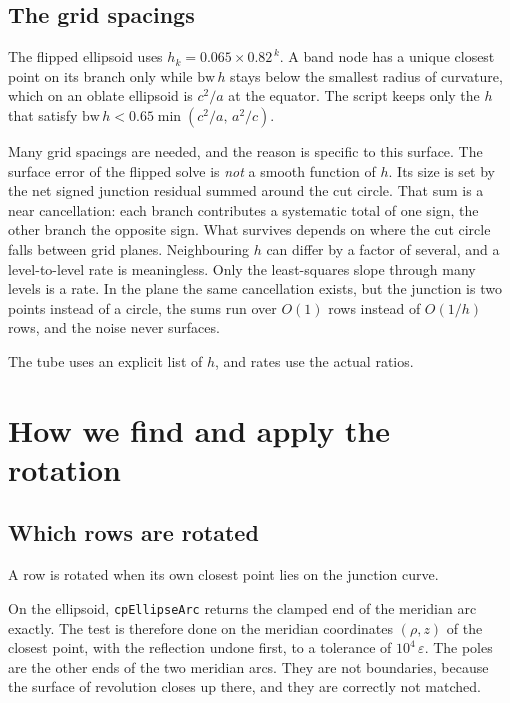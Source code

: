 \subsection{The grid spacings}

The flipped ellipsoid uses $h_k = 0.065\times 0.82^{\,k}$. A band node
has a unique closest point on its branch only while $\mathrm{bw}\,h$
stays below the smallest radius of curvature, which on an oblate
ellipsoid is $c^2/a$ at the equator. The script keeps only the $h$ that
satisfy $\mathrm{bw}\,h < 0.65\min(c^2/a,\, a^2/c)$.

Many grid spacings are needed, and the reason is specific to this
surface. The surface error of the flipped solve is \emph{not} a smooth
function of $h$. Its size is set by the net signed junction residual
summed around the cut circle. That sum is a near cancellation: each
branch contributes a systematic total of one sign, the other branch the
opposite sign. What survives depends on where the cut circle falls
between grid planes. Neighbouring $h$ can differ by a factor of several,
and a level-to-level rate is meaningless. Only the least-squares slope
through many levels is a rate. In the plane the same cancellation exists,
but the junction is two points instead of a circle, the sums run over
$O(1)$ rows instead of $O(1/h)$ rows, and the noise never surfaces.

The tube uses an explicit list of $h$, and rates use the actual ratios.

\section{How we find and apply the rotation}




\subsection{Which rows are rotated}

A row is rotated when its own closest point lies on the junction curve.

On the ellipsoid, \texttt{cpEllipseArc} returns the clamped end of the
meridian arc exactly. The test is therefore done on the meridian
coordinates $(\rho,z)$ of the closest point, with the reflection undone
first, to a tolerance of $10^4\,\varepsilon$. The poles are the other
ends of the two meridian arcs. They are not boundaries, because the
surface of revolution closes up there, and they are correctly not
matched.

